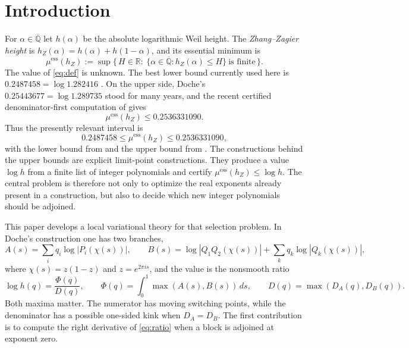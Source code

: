 \documentclass[11pt,reqno]{amsart}
\theoremstyle{plain}
\theoremstyle{definition}
\theoremstyle{remark}
\newcommand{\Q}{\mathbb{Q}}
\newcommand{\R}{\mathbb{R}}
\newcommand{\Qbar}{\overline{\Q}}
\newcommand{\hZ}{h_Z}
\newcommand{\essmin}{\mu^{\mathrm{ess}}(\hZ)}
\newcommand{\dA}{D_A}
\newcommand{\dB}{D_B}
\begin{document}
\maketitle

\section{Introduction}\label{sec:intro}

For $\alpha\in\Qbar$ let $h(\alpha)$ be the absolute logarithmic Weil height.  The
\emph{Zhang--Zagier height} \citep{Zha95,Zag93} is
$\hZ(\alpha)=h(\alpha)+h(1-\alpha)$, and its essential minimum is
\begin{equation}\label{eq:def}
  \essmin:=\sup\bigl\{\,H\in\R:\ \{\alpha\in\Qbar:\hZ(\alpha)\le H\}\ \text{is finite}\,\bigr\}.
\end{equation}
The value of \eqref{eq:def} is unknown.  The best lower bound currently used here is
$0.2487458=\log 1.282416$ \citep{F18}.  On the upper side, Doche's
$0.25443677=\log 1.289735$ \citep{Doc01b} stood for many years, and the recent certified denominator-first computation of \citet{Gri26} gives
\[
  \essmin\le 0.2536331090.
\]
Thus the presently relevant interval is
\[
  0.2487458\le\essmin\le0.2536331090,
\]
with the lower bound from \citet{F18} and the upper bound from \citet{Gri26}.
The constructions behind the upper bounds are explicit limit-point constructions.
They produce a value $\log h$ from a finite list of integer polynomials and certify
$\essmin\le\log h$.  The central problem is therefore not only to optimize the real
exponents already present in a construction, but also to decide which new integer
polynomials should be adjoined.

This paper develops a local variational theory for that selection problem.  In
Doche's construction one has two branches,
\[
  A(s)=\sum_i q_i\log|P_i(\chi(s))|,\qquad
  B(s)=\log|Q_1Q_2(\chi(s))|+\sum_k q_k\log|Q_k(\chi(s))|,
\]
where $\chi(s)=z(1-z)$ and $z=e^{2\pi i s}$, and the value is the nonsmooth ratio
\begin{equation}\label{eq:ratio}
  \log h(q)=\frac{\Phi(q)}{D(q)},\qquad
  \Phi(q)=\int_0^1\max(A(s),B(s))\,ds,
  \qquad D(q)=\max(\dA(q),\dB(q)).
\end{equation}
Both maxima matter.  The numerator has moving switching points, while the denominator
has a possible one-sided kink when $\dA=\dB$.  The first contribution is to compute the
right derivative of \eqref{eq:ratio} when a block is adjoined at exponent zero.
\end{document}
